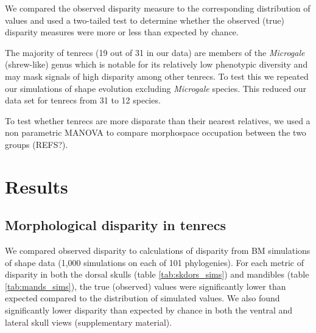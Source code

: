 \documentclass[12pt,a4paper]{article}
\begin{document}
We compared the observed disparity measure to the corresponding distribution of values and used a two-tailed test to determine whether the observed (true) disparity measures were more or less than expected by chance.

The majority of tenrecs (19 out of 31 in our data) are members of the \textit{Microgale} (shrew-like) genus which is notable for its relatively low phenotypic diversity \citep{ Soarimalala2011, Jenkins2003} and may mask signals of high disparity among other tenrecs. To test this we repeated our simulations of shape evolution excluding \textit{Microgale} species. This reduced our data set for tenrecs from 31 to 12 species. 

To test whether tenrecs are more disparate than their nearest relatives, we used a non parametric MANOVA \citep{Anderson2001} to compare morphospace occupation between the two groups (REFS?). 


\section{Results}

\subsection{Morphological disparity in tenrecs} 
	

We compared observed disparity to calculations of disparity from BM simulations of shape data (1,000 simulations on each of 101 phylogenies). For each metric of disparity in both the dorsal skulls (table \ref{tab:skdors_sims}) and mandibles (table \ref{tab:mands_sims}), the true (observed) values were significantly lower than expected compared to the distribution of simulated values. We also found significantly lower disparity than expected by chance in both the ventral and lateral skull views (supplementary material).


\end{document}
